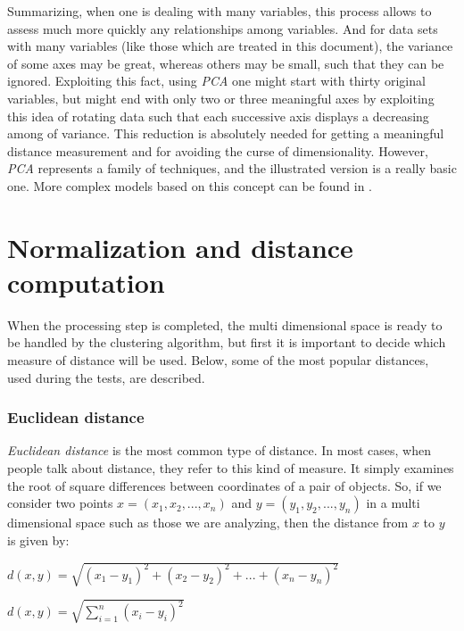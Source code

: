 \documentclass[12pt,a4paper,cucitura]{toptesi}
\begin{document}
Summarizing, when one is dealing with many variables, this process allows to assess much more quickly any relationships among variables. And for data sets with many variables (like those which are treated in this document), the variance of some axes may be great, whereas others may be small, such that they can be ignored. Exploiting this fact, using \emph{PCA} one might start with thirty original variables, but might end with only two or three meaningful axes by exploiting this idea of rotating data such that each successive axis displays a decreasing among of variance. This reduction is absolutely needed for getting a meaningful distance measurement and for avoiding the curse of dimensionality. 
However, \emph{PCA} represents a family of techniques, and the illustrated version is a really basic one. More complex models based on this concept can be found in \cite{pca}.

\section{Normalization and distance computation}

When the processing step is completed, the multi dimensional space is ready to be handled by the clustering algorithm, but first it is important to decide which measure of distance will be used.
Below, some of the most popular distances, used during the tests, are described.

\subsubsection{Euclidean distance}

\emph{Euclidean distance} is the most common type of distance.
In most cases, when people talk about distance, they refer to this kind of measure.
It simply examines the root of square differences between coordinates of a pair of objects.
So, if we consider two points $x = (x_1, x_2, ..., x_n)$ and $y = (y_1, y_2, ..., y_n)$ in a multi dimensional space such as those we are analyzing, then the distance from $x$ to $y$ is given by:

\begin{center}
\Large
$d(x,y) = \sqrt{(x_1 - y_1)^2 + (x_2 - y_2)^2 + ... + (x_n - y_n)^2}$
\end{center}

\begin{center}
\Large
$d(x,y) = \sqrt{\sum_{i=1}^{n}{(x_i - y_i)^2}}$
\end{center}
\end{document}

